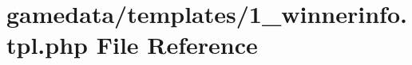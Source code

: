 \hypertarget{1__winnerinfo_8tpl_8php}{\section{gamedata/templates/1\+\_\+winnerinfo.tpl.\+php File Reference}
\label{1__winnerinfo_8tpl_8php}
}
